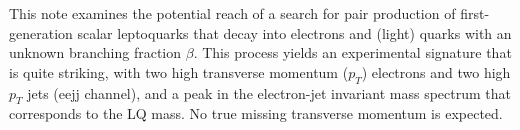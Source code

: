 %

This note examines the potential reach of a search for
pair production of first-generation
scalar leptoquarks that decay into electrons and
(light) quarks with an unknown branching fraction $\beta$.
This process yields an experimental signature that
is quite striking, with two
high transverse momentum ($p_T$) electrons
and two high $p_T$ jets (eejj channel), and
a peak in the electron-jet invariant mass
spectrum that corresponds to the LQ mass.
No true missing transverse momentum is expected.


